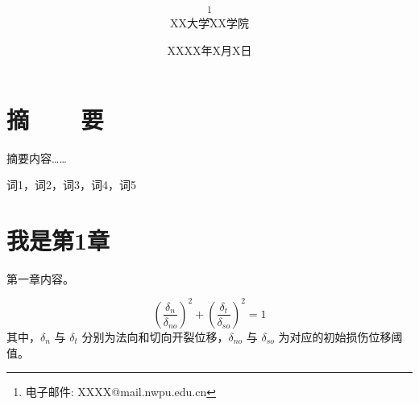 
\let\cleardoublepage\clearpage


\title{\\[20ex]}
\author{
    \thanks{电子邮件: XXXX@mail.nwpu.edu.cn}\\[2ex]
    \sanhao XX大学XX学院\\[2ex]
}
\date{\sanhao XXXX年X月X日}



\renewcommand{\thefootnote}{}  %
\xiaosi\song  %
\renewcommand{\d}{\mathrm{d}}  %
\frontmatter %

\begingroup
\let\newpage\relax  %
\thispagestyle{empty}  %
\maketitle
\endgroup

\newpage
\setcounter{page}{1}  %


\chapter*{摘~~~~要}
摘要内容……

\vspace{1em}
 \quad 词1，词2，词3，词4，词5

\newpage


{}
\tableofcontents

\mainmatter  %


\chapter{我是第1章}
第一章内容。

\begin{equation}
\left( \frac{\delta_n}{\delta_{no}} \right)^2 + \left( \frac{\delta_t}{\delta_{so}} \right)^2 = 1
\label{eq:damage_initiation}
\end{equation}
其中，$\delta_n$ 与 $\delta_t$ 分别为法向和切向开裂位移，$\delta_{no}$ 与 $\delta_{so}$ 为对应的初始损伤位移阈值。

